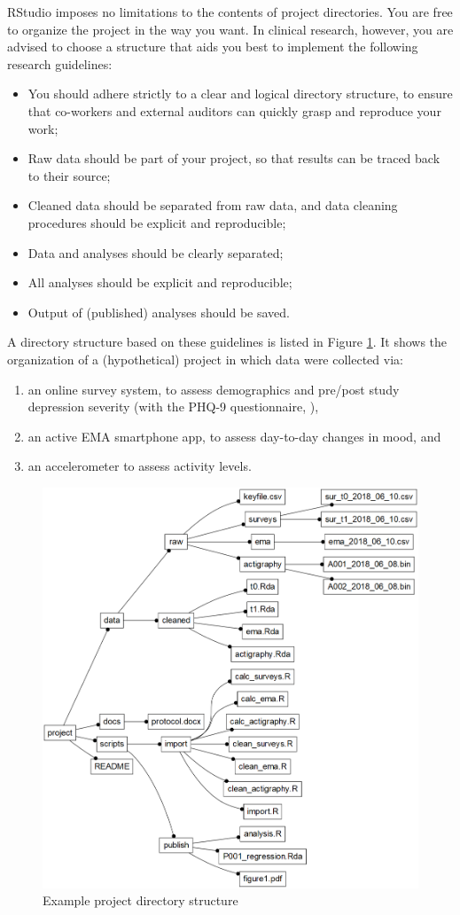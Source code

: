 \documentclass[]{book}
\begin{document}

RStudio imposes no limitations to the contents of project directories.
You are free to organize the project in the way you want. In clinical
research, however, you are advised to choose a structure that aids you
best to implement the following research guidelines:

\begin{itemize}
\item
  You should adhere strictly to a clear and logical directory structure,
  to ensure that co-workers and external auditors can quickly grasp and
  reproduce your work;
\item
  Raw data should be part of your project, so that results can be traced
  back to their source;
\item
  Cleaned data should be separated from raw data, and data cleaning
  procedures should be explicit and reproducible;
\item
  Data and analyses should be clearly separated;
\item
  All analyses should be explicit and reproducible;
\item
  Output of (published) analyses should be saved.
\end{itemize}

A directory structure based on these guidelines is listed in Figure
\ref{fig:dm-project-tree}. It shows the organization of a (hypothetical)
project in which data were collected via:

\begin{enumerate}
\def\labelenumi{\arabic{enumi}.}
\item
  an online survey system, to assess demographics and pre/post study
  depression severity (with the PHQ-9 questionnaire,
  \citet{Kroenke2009}),
\item
  an active EMA smartphone app, to assess day-to-day changes in mood,
  and
\item
  an accelerometer to assess activity levels.
\end{enumerate}

\begin{figure}

{\centering \includegraphics[width=0.5\linewidth]{images/datamanagement/project_tree} 

}

\caption{Example project directory structure}\label{fig:dm-project-tree}
\end{figure}
\end{document}
